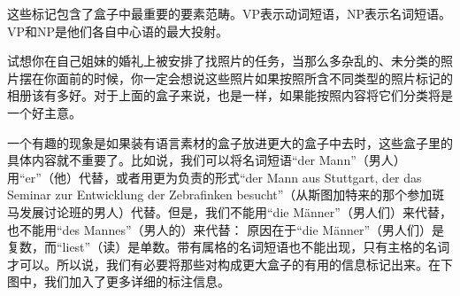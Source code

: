 这些标记包含了盒子中最重要的要素范畴。VP表示动词短语，NP表示名词短语。VP和NP是他们各自中心语的最大投射。

试想你在自己姐妹的婚礼上被安排了找照片的任务，当那么多杂乱的、未分类的照片摆在你面前的时候，你一定会想说这些照片如果按照所含不同类型的照片标记的相册该有多好。对于上面的盒子来说，也是一样，如果能按照内容将它们分类将是一个好主意。

一个有趣的现象是如果装有语言素材的盒子放进更大的盒子中去时，这些盒子里的具体内容就不重要了。比如说，我们可以将名词短语“der Mann”（男人）用“er”（他）代替，或者用更为负责的形式“der Mann aus Stuttgart, der das Seminar zur Entwicklung der Zebrafinken besucht”（从斯图加特来的那个参加斑马发展讨论班的男人）代替。但是，我们不能用“die Männer”（男人们）来代替，也不能用“des Mannes”（男人的）来代替：
\eal 
{} 
\zl 
原因在于“die Männer”（男人们）是复数，而“liest”（读）是单数。带有属格的名词短语也不能出现，只有主格的名词才可以。所以说，我们有必要将那些对构成更大盒子的有用的信息标记出来。在下图中，我们加入了更多详细的标注信息。

